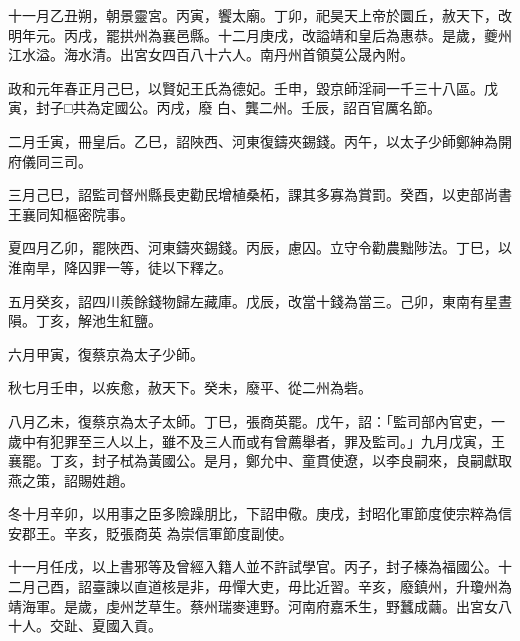\begin{pinyinscope}
 十一月乙丑朔，朝景靈宮。丙寅，饗太廟。丁卯，祀昊天上帝於圜丘，赦天下，改明年元。丙戌，罷拱州為襄邑縣。十二月庚戌，改謚靖和皇后為惠恭。是歲，夔州江水溢。海水清。出宮女四百八十六人。南丹州首領莫公晟內附。



 政和元年春正月己巳，以賢妃王氏為德妃。壬申，毀京師淫祠一千三十八區。戊寅，封子□共為定國公。丙戌，廢
 白、龔二州。壬辰，詔百官厲名節。



 二月壬寅，冊皇后。乙巳，詔陜西、河東復鑄夾錫錢。丙午，以太子少師鄭紳為開府儀同三司。



 三月己巳，詔監司督州縣長吏勸民增植桑柘，課其多寡為賞罰。癸酉，以吏部尚書王襄同知樞密院事。



 夏四月乙卯，罷陜西、河東鑄夾錫錢。丙辰，慮囚。立守令勸農黜陟法。丁巳，以淮南旱，降囚罪一等，徒以下釋之。



 五月癸亥，詔四川羨餘錢物歸左藏庫。戊辰，改當十錢為當三。己卯，東南有星晝隕。丁亥，解池生紅鹽。



 六月甲寅，復蔡京為太子少師。



 秋七月壬申，以疾愈，赦天下。癸未，廢平、從二州為砦。



 八月乙未，復蔡京為太子太師。丁巳，張商英罷。戊午，詔：「監司部內官吏，一歲中有犯罪至三人以上，雖不及三人而或有曾薦舉者，罪及監司。」九月戊寅，王襄罷。丁亥，封子栻為黃國公。是月，鄭允中、童貫使遼，以李良嗣來，良嗣獻取燕之策，詔賜姓趙。



 冬十月辛卯，以用事之臣多險躁朋比，下詔申儆。庚戌，封昭化軍節度使宗粹為信安郡王。辛亥，貶張商英
 為崇信軍節度副使。



 十一月任戌，以上書邪等及曾經入籍人並不許試學官。丙子，封子榛為福國公。十二月己酉，詔臺諫以直道核是非，毋憚大吏，毋比近習。辛亥，廢鎮州，升瓊州為靖海軍。是歲，虔州芝草生。蔡州瑞麥連野。河南府嘉禾生，野蠶成繭。出宮女八十人。交趾、夏國入貢。



\end{pinyinscope}
